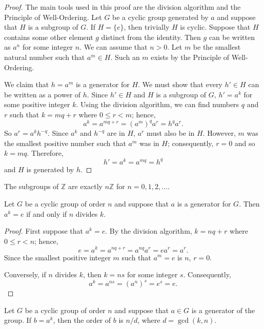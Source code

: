  
\begin{proof}
The main tools used in this proof are the division algorithm and the
Principle of Well-Ordering. Let $G$ be a cyclic group generated by $a$
and suppose that $H$ is a subgroup of $G$. If $H = \{ e \}$, then
trivially $H$ is cyclic. Suppose that $H$ contains some other element
$g$ distinct from the identity. Then $g$ can be written as
$a^n$ for some integer $n$. We can assume that $n > 0$. Let $m$ be the
smallest natural number such that $a^m \in H$. Such an $m$ exists by
the Principle of Well-Ordering.
 
 
We claim that $h = a^m$ is a generator for $H$.  We must show that
every $h' \in H$ can be written as a power of $h$. Since $h' \in H$
and $H$ is a subgroup of $G$, $h' = a^k$ for some positive integer
$k$. Using the division algorithm, we can find numbers $q$ and $r$
such that $k = mq +r$ where $0 \leq r < m$; hence,
$$
a^k = a^{mq +r} = (a^m)^q a^r = h^q a^r.
$$
So $a^r = a^k h^{-q}$. Since $a^k$ and $h^{-q}$ are in $H$, $a^r$ must
also be in $H$.  However, $m$ was the smallest positive number such that
$a^m$ was in $H$; consequently, $r=0$ and so $k=mq$. Therefore, 
$$
h' = a^k = a^{mq} =  h^q
$$
and $H$ is generated by $h$.
\end{proof}
 
 
\begin{corollary}
The subgroups of ${\mathbb Z}$ are exactly $n{\mathbb Z}$ for $n = 0, 1, 2,
\ldots$. 
\end{corollary}
 
 
\begin{proposition}
Let $G$ be a cyclic group of order $n$ and suppose that $a$ is a
generator for  $G$. Then $a^k=e$ if and only if $n$ divides $k$.
\end{proposition}
 
 
\begin{proof}
First suppose that $a^k=e$. By the division algorithm, $k = nq + r$
where $0 \leq r < n$; hence, 
$$
e = a^k = a^{nq + r} = a^{nq} a^r = e a^r = a^r.
$$
Since the smallest positive integer $m$ such that $a^m = e$ is $n$, $r
= 0$.
 
 
Conversely, if $n$ divides $k$, then $k=ns$ for some integer $s$.
Consequently, 
$$
a^k = a^{ns} = (a^n)^s = e^s = e.
$$
\end{proof}
 
 
\begin{theorem}
Let $G$ be a cyclic group of order $n$ and suppose that $a \in G$ is a
generator of the group.  If $b = a^k$, then the order of $b$ is $n
/d$, where $d = \gcd(k,n)$. 
\end{theorem}
 
